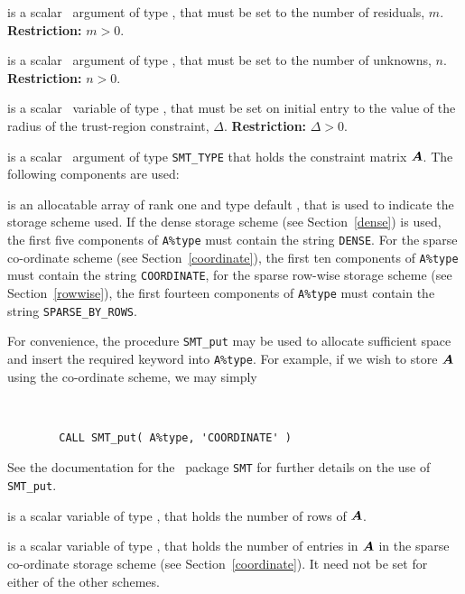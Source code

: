 \documentclass{galahad}
\begin{document}
\begin{description}

 is a scalar \intentin\ argument of type \integer, that must be
set to the number of residuals, $m$. {\bf Restriction: } $m  >  0$.

 is a scalar \intentin\ argument of type \integer, that must be
set to the number of unknowns, $n$. {\bf Restriction: } $n  >  0$.

 is a scalar \intentin\ variable of type \realdp,
that must be set on initial entry
to the value of the radius of the trust-region constraint, $\Delta$.
{\bf Restriction: } $\Delta > 0$.

 is a scalar \intentin\ argument of type {\tt SMT\_TYPE}
that holds the constraint matrix ${\bm{A}}$. The following components are used:

\begin{description}

 is an allocatable array of rank one and type default
\character, that
is used to indicate the storage scheme used. If the dense storage scheme
(see Section~\ref{dense}) is used,
the first five components of {\tt A\%type} must contain the
string {\tt DENSE}.
For the sparse co-ordinate scheme (see Section~\ref{coordinate}),
the first ten components of {\tt A\%type} must contain the
string {\tt COORDINATE},
for the sparse row-wise storage scheme (see Section~\ref{rowwise}),
the first fourteen components of {\tt A\%type} must contain the
string {\tt SPARSE\_BY\_ROWS}.

For convenience, the procedure {\tt SMT\_put}
may be used to allocate sufficient space and insert the required keyword
into {\tt A\%type}.
For example, if we wish to store ${\bm{A}}$ using the co-ordinate scheme,
we may simply
{\tt
\begin{verbatim}
        CALL SMT_put( A%type, 'COORDINATE' )
\end{verbatim}
}
\noindent
See the documentation for the \galahad\ package {\tt SMT}
for further details on the use of {\tt SMT\_put}.

 is a scalar variable of type \integer, that
holds the number of rows of ${\bm{A}}$.

 is a scalar variable of type \integer, that
holds the number of entries in ${\bm{A}}$
in the sparse co-ordinate storage scheme (see Section~\ref{coordinate}).
It need not be set for either of the other schemes.


\end{description}
\end{description}
\end{document}
